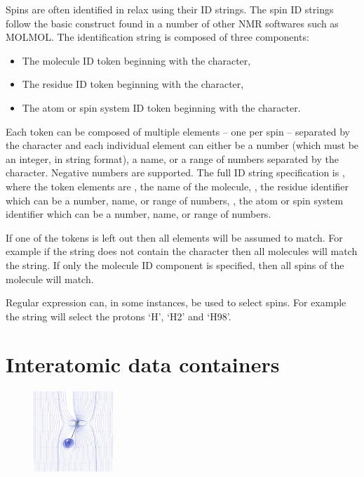 Spins are often identified in relax using their ID strings.  The spin ID strings follow the basic construct found in a number of other NMR softwares such as MOLMOL.  The identification string is composed of three components:

\begin{itemize}
\item The molecule ID token beginning with the \promptstring{\#} character,
\item The residue ID token beginning with the \promptstring{:} character,
\item The atom or spin system ID token beginning with the  character.
\end{itemize}

Each token can be composed of multiple elements -- one per spin -- separated by the \promptstring{,} character and each individual element can either be a number (which must be an integer, in string format), a name, or a range of numbers separated by the \promptstring{-} character.  Negative numbers are supported.  The full ID string specification is , where the token elements are , the name of the molecule, , the residue identifier which can be a number, name, or range of numbers, , the atom or spin system identifier which can be a number, name, or range of numbers.

If one of the tokens is left out then all elements will be assumed to match.  For example if the string does not contain the \promptstring{\#} character then all molecules will match the string.  If only the molecule ID component is specified, then all spins of the molecule will match.

Regular expression can, in some instances, be used to select spins.  For example the string  will select the protons `H', `H2' and `H98'.




\section{Interatomic data containers} \label{sect: interatomic container}

\begin{figure}[h]
\includegraphics[width=3cm, bb=0 0 1701 1701]{graphics/wizards/dipole_pair/NH_dipole_pair_600x600}
\end{figure}

